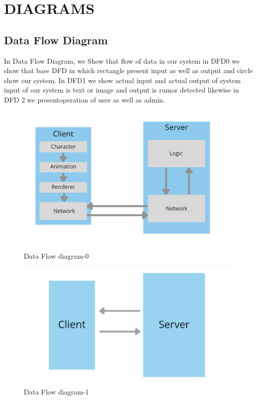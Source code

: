 \documentclass[12pt]{report}
\begin{document}
\section{DIAGRAMS}
\justifying
\setlength{\parindent}{4em}
\setlength{\parskip}{0.5em}
\renewcommand{\baselinestretch}{1.5}
\normalsize
\subsection{Data Flow Diagram}
In Data Flow Diagram, we Show that flow of data in our system in DFD0 we show that 
base DFD in which rectangle present input as well as output and circle show our system. 
In DFD1 we show actual input and actual output of system input of our system is text or 
image and output is rumor detected likewise in DFD 2 we presentoperation of user as well
as admin.

\vspace{1cm}
\begin{figure}[h]
\centering
\includegraphics[scale=0.7]{ Data Flow diagram-0.png}
\caption{ Data Flow diagram-0}
\label{ Data Flow diagram-0}
\end{figure}


\vspace{1cm}
\begin{figure}[h]
\centering
\includegraphics[scale=0.8]{ Data Flow diagram-1.png}
\caption{ Data Flow diagram-1}
\label{ Data Flow diagram-1}
\end{figure}
\end{document}

